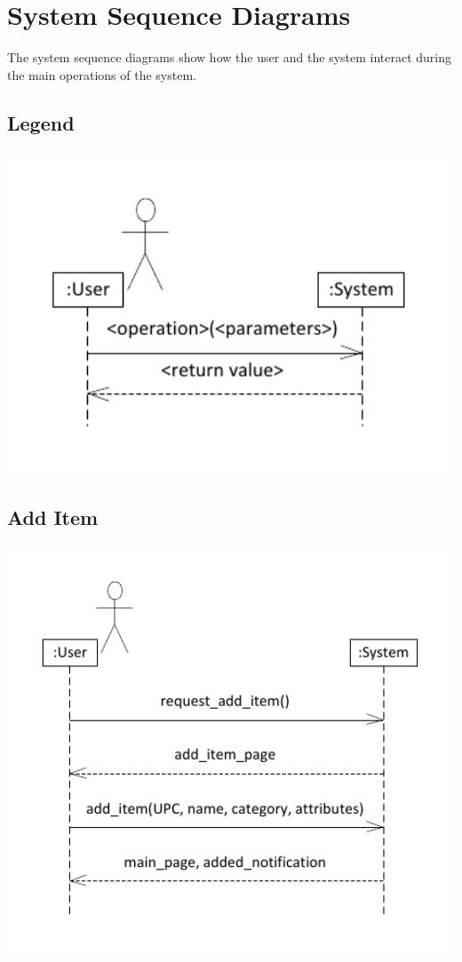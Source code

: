 \documentclass{article}
\begin{document}
\section{System Sequence Diagrams}
The system sequence diagrams show how the user and the system interact during the main operations of the system.\\
\subsection{Legend}
\includegraphics[keepaspectratio, width=6in]{ssd_legend.pdf}\\
\subsection{Add Item}
\includegraphics[keepaspectratio, width=6in]{ssd_add_item.pdf}\\
\end{document}
